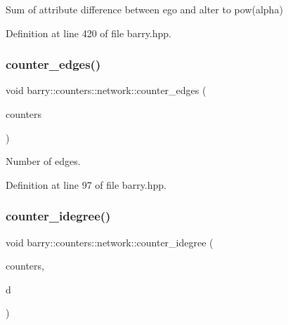 Sum of attribute difference between ego and alter to pow(alpha) 



Definition at line 420 of file barry.\+hpp.

\mbox{\label{namespacebarry_1_1counters_1_1network_a3c0a9e6c5697b3ec65827d405826bb33}} 
\subsubsection{\texorpdfstring{counter\+\_\+edges()}{counter\_edges()}}
{\footnotesize\ttfamily void barry\+::counters\+::network\+::counter\+\_\+edges (\begin{DoxyParamCaption}\item[{\hyperlink{namespacebarry_1_1counters_1_1network_a3b3c590303d47840d1967372ae495d95}{Net\+Counter\+Vector} $\ast$}]{counters }\end{DoxyParamCaption})\hspace{0.3cm}{\ttfamily [inline]}}



Number of edges. 



Definition at line 97 of file barry.\+hpp.

\mbox{\label{namespacebarry_1_1counters_1_1network_ab87617883960a1fc818048036fb13b83}} 
\subsubsection{\texorpdfstring{counter\+\_\+idegree()}{counter\_idegree()}}
{\footnotesize\ttfamily void barry\+::counters\+::network\+::counter\+\_\+idegree (\begin{DoxyParamCaption}\item[{\hyperlink{namespacebarry_1_1counters_1_1network_a3b3c590303d47840d1967372ae495d95}{Net\+Counter\+Vector} $\ast$}]{counters,  }\item[{std\+::vector$<$ \hyperlink{namespacebarry_a11dfc53ddb4672278319aa04f1e09a6c}{uint} $>$}]{d }\end{DoxyParamCaption})\hspace{0.3cm}{\ttfamily [inline]}}



